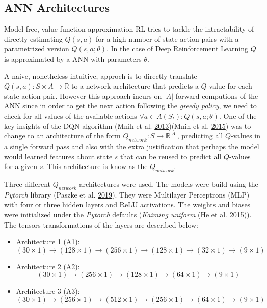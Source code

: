 \documentclass[
  openany]{book}
\providecommand{\tightlist}{%
  \setlength{\itemsep}{0pt}\setlength{\parskip}{0pt}}
\begin{document}
\hypertarget{ann-architectures}{%
\subsection{ANN Architectures}\label{ann-architectures}}

Model-free, value-function approximation RL tries to tackle the intractability of directly estimating \(Q(s,a)\) for a high number of state-action pairs with a parametrized version \(Q(s,a;\theta)\). In the case of Deep Reinforcement Learning \(Q\) is approximated by a ANN with parameters \(\theta\).

A naive, nonetheless intuitive, approch is to directly translate \(Q(s,a): S \times A \to \mathds{R}\) to a network architecture that predicts a \(Q\)-value for each state-action pair. However this approach incurs on \(|A|\) forward computions of the ANN since in order to get the next action following the \emph{greedy policy}, we need to check for all values of the available actions \(\forall a \in A(S_t): Q(s,a;\theta)\). One of the key insights of the DQN algorithm (Mnih et al. \protect\hyperlink{ref-mnih2013playing}{2013})(Mnih et al. \protect\hyperlink{ref-mnih2015human}{2015}) was to change to an architecture of the form \(Q_{network}: S \to \mathds{R}^{|A|}\), predicting all \(Q\)-values in a single forward pass and also with the extra justification that perhaps the model would learned features about state \(s\) that can be reused to predict all \(Q\)-values for a given \(s\). This architecture is know as the \(Q_{network}\).

Three different \(Q_{network}\) architectures were used. The models were build using the \emph{Pytorch} library (Paszke et al. \protect\hyperlink{ref-NEURIPS2019_9015}{2019}). They were Multilayer Perceptrons (MLP) with four or three hidden layers and ReLU activations. The weights and biases were initialized under the \emph{Pytorch} defaults (\emph{Kaiming uniform} (He et al. \protect\hyperlink{ref-he2015delving}{2015})). The tensors transformations of the layers are described below:

\begin{itemize}
\tightlist
\item
  Architecture 1 (A1):
  \[(30 \times 1) \to (128 \times 1) \to (256 \times 1) \to (128 \times 1) \to (32 \times 1) \to (9 \times 1)\]
\item
  Architecture 2 (A2):
  \[(30 \times 1) \to (256 \times 1) \to (128 \times 1) \to (64 \times 1) \to (9 \times 1)\]
\item
  Architecture 3 (A3):
  \[(30 \times 1) \to (256 \times 1) \to (512 \times 1) \to (256 \times 1) \to (64 \times 1) \to (9 \times 1)\]
\end{itemize}
\end{document}
